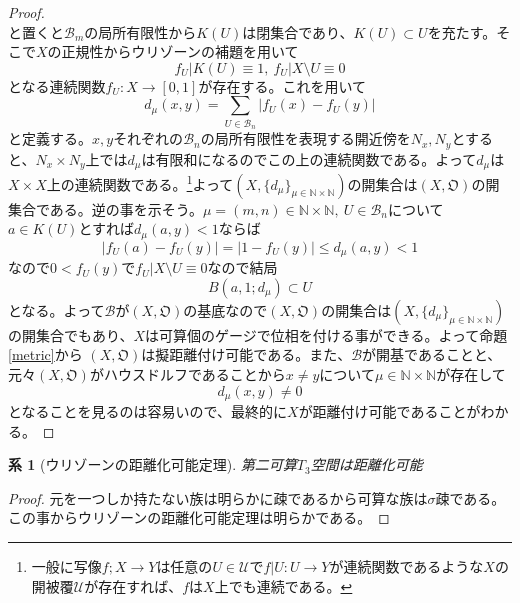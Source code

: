 \documentclass[leqno]{jsarticle}
\newtheorem{cor}[thm]{系}
\newcommand{\To}{\Longrightarrow}
\newcommand{\nn}{\mathbb{N}}
\begin{document}
\begin{proof}
\[\]
と置くと$\mathcal{B}_m$の局所有限性から$K(U)$は閉集合であり、$K(U)\subset U$を充たす。そこで$X$の正規性からウリゾーンの補題を用いて
\[
f_{U}|K(U)\equiv 1,\ f_U|X\setminus U\equiv 0
\]
となる連続関数$f_U:X\to [0,1]$が存在する。これを用いて
\[
d_{\mu}(x,y)=\sum_{U\in \mathcal{B}_n}|f_{U}(x)-f_U(y)|
\]
と定義する。$x,y$それぞれの$\mathcal{B}_n$の局所有限性を表現する開近傍を$N_x,N_y$とすると、$N_x\times N_y$上では$d_{\mu}$は有限和になるのでこの上の連続関数である。よって$d_{\mu}$は$X\times X$上の連続関数である。\footnote{一般に写像$f;X\to Y$は任意の$U\in \mathcal{U}$で$f|U:U\to Y$が連続関数であるような$X$の開被覆$\mathcal{U}$が存在すれば、$f$は$X$上でも連続である。}よって$(X,\{d_{\mu}\}_{\mu\in \nn\times \nn})$の開集合は$(X,\mathfrak{O})$の開集合である。逆の事を示そう。$\mu=(m,n)\in \nn\times \nn,\ U\in \mathcal{B}_n$について$a\in K(U)$とすれば$d_{\mu}(a,y)<1$ならば
\[
|f_U(a)-f_U(y)|=|1-f_U(y)|\le d_{\mu}(a,y)<1
\]
なので$0<f_U(y)$で$f_U|X\setminus U\equiv 0$なので結局
\[
B(a,1;d_{\mu})\subset U
\]
となる。よって$\mathcal{B}$が$(X,\mathfrak{O})$の基底なので$(X,\mathfrak{O})$の開集合は$(X,\{d_{\mu}\}_{\mu\in \nn\times \nn})$の開集合でもあり、$X$は可算個のゲージで位相を付ける事ができる。よって命題\ref{metric}から
$(X,\mathfrak{O})$は擬距離付け可能である。また、$\mathcal{B}$が開基であることと、元々$(X,\mathfrak{O})$がハウスドルフであることから$x\neq y$について$\mu \in \nn\times \nn$が存在して
\[
d_{\mu}(x,y)\neq 0
\]
となることを見るのは容易いので、最終的に$X$が距離付け可能であることがわかる。
\par[$(3)\To (1)$の証明終わり]
\end{proof}
\setcounter{equation}{0}
\begin{cor}[ウリゾーンの距離化可能定理]
第二可算$T_3$空間は距離化可能
\end{cor}
\begin{proof}
元を一つしか持たない族は明らかに疎であるから可算な族は$\sigma$疎である。この事からウリゾーンの距離化可能定理は明らかである。
\end{proof}
\end{document}

